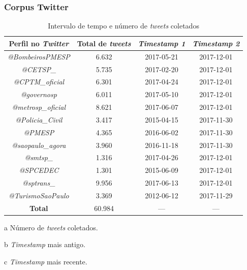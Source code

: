 \documentclass{beamer}
\begin{document}
\begin{frame}
\frametitle{Corpus Twitter}
\begin{table}[!htb]
\centering
\caption{Intervalo de tempo e número de \textit{tweets} coletados}
	\label{tab:tweetsCollected}
\begin{adjustbox}{max height=28mm}
\begin{threeparttable}
\begin{tabular}{c|c|c|c}
\toprule
\textbf {Perfil no \textit{Twitter}} &\textbf{Total de \textit{tweets}\tnote{a}}  &\textbf{ \textit{Timestamp 1\tnote{b}}} & \textbf{\textit{Timestamp 2\tnote{c}}} \\ 
\midrule
\textit{@BombeirosPMESP} & 6.632 & 2017-05-21 & 2017-12-01 \\
\hline
\textit{@CETSP\_} & 5.735 & 2017-02-20  & 2017-12-01 \\
\hline
\textit{@CPTM\_oficial} & 6.301 & 2017-04-24 & 2017-12-01 \\
\hline
\textit{@governosp}  & 6.011 & 2017-05-10 & 2017-12-01 \\
\hline
\textit{@metrosp\_oficial} & 8.621 & 2017-06-07 & 2017-12-01 \\
\hline
\textit{@Policia\_Civil}  & 3.417 & 2015-04-15 & 2017-11-30 \\
\hline
\textit{@PMESP}  & 4.365 & 2016-06-02 & 2017-11-30 \\
\hline
\textit{@saopaulo\_agora}  & 3.960 & 2016-11-18 & 2017-11-30 \\
\hline
\textit{@smtsp\_} & 1.316 & 2017-04-26 & 2017-12-01 \\
\hline
\textit{@SPCEDEC} & 1.301 & 2015-06-09 & 2017-12-01 \\
\hline
\textit{@sptrans\_} & 9.956 & 2017-06-13 & 2017-12-01 \\
\hline
\textit{@TurismoSaoPaulo} & 3.369 & 2012-06-12 & 2017-11-29 \\
\midrule
\midrule
\textbf{\alert{Total}} & \alert{60.984} & --- & --- \\
\bottomrule
\end{tabular}
\begin{tablenotes}
            \item[a] Número de \textit{tweets} coletados.
            \item[b] \textit{Timestamp} mais antigo.
            \item[c] \textit{Timestamp} mais recente.
        \end{tablenotes}
\end{threeparttable}
\end{adjustbox}
\end{table}
\end{frame}
\end{document}
